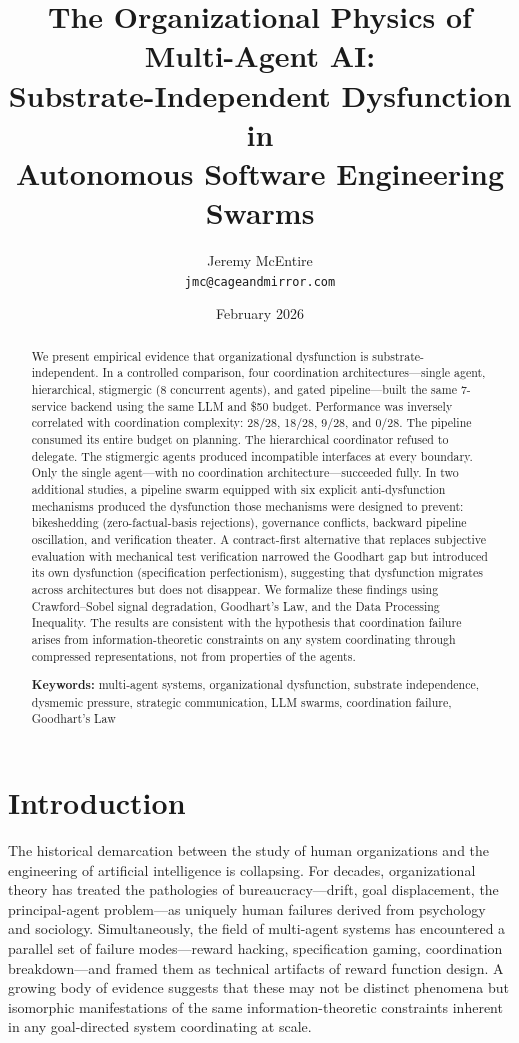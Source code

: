 \documentclass[11pt,a4paper]{article}
\title{The Organizational Physics of Multi-Agent AI:\\
Substrate-Independent Dysfunction in\\
Autonomous Software Engineering Swarms}
\author{Jeremy McEntire\\
\texttt{jmc@cageandmirror.com}}
\date{February 2026}
\begin{document}
\maketitle

\begin{abstract}
We present empirical evidence that organizational dysfunction is substrate-independent. In a controlled comparison, four coordination architectures---single agent, hierarchical, stigmergic (8 concurrent agents), and gated pipeline---built the same 7-service backend using the same LLM and \$50 budget. Performance was inversely correlated with coordination complexity: 28/28, 18/28, 9/28, and 0/28. The pipeline consumed its entire budget on planning. The hierarchical coordinator refused to delegate. The stigmergic agents produced incompatible interfaces at every boundary. Only the single agent---with no coordination architecture---succeeded fully. In two additional studies, a pipeline swarm equipped with six explicit anti-dysfunction mechanisms produced the dysfunction those mechanisms were designed to prevent: bikeshedding (zero-factual-basis rejections), governance conflicts, backward pipeline oscillation, and verification theater. A contract-first alternative that replaces subjective evaluation with mechanical test verification narrowed the Goodhart gap but introduced its own dysfunction (specification perfectionism), suggesting that dysfunction migrates across architectures but does not disappear. We formalize these findings using Crawford--Sobel signal degradation, Goodhart's Law, and the Data Processing Inequality. The results are consistent with the hypothesis that coordination failure arises from information-theoretic constraints on any system coordinating through compressed representations, not from properties of the agents.

\medskip
\noindent\textbf{Keywords:} multi-agent systems, organizational dysfunction, substrate independence, dysmemic pressure, strategic communication, LLM swarms, coordination failure, Goodhart's Law
\end{abstract}


\section{Introduction}
\label{sec:intro}

The historical demarcation between the study of human organizations and the engineering of artificial intelligence is collapsing. For decades, organizational theory has treated the pathologies of bureaucracy---drift, goal displacement, the principal-agent problem---as uniquely human failures derived from psychology and sociology. Simultaneously, the field of multi-agent systems has encountered a parallel set of failure modes---reward hacking, specification gaming, coordination breakdown---and framed them as technical artifacts of reward function design. A growing body of evidence suggests that these may not be distinct phenomena but isomorphic manifestations of the same information-theoretic constraints inherent in any goal-directed system coordinating at scale.
\end{document}
